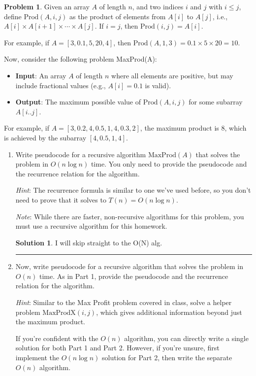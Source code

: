 \documentclass{article}
\theoremstyle{definition}
\newtheorem{problem}{Problem}
\def\fline{\rule{0.75\linewidth}{0.5pt}}
\newcommand{\finishline}{
  \begin{center}\fline
\end{center}}
\newtheorem*{solution*}{Solution}
\newenvironment{solution}{
\begin{solution*}}{{\finishline}
\end{solution*}}
\begin{document}
\newpage

\begin{problem}
  Given an array \( A \) of length \( n \), and two indices \( i \) and \( j \) with \( i \leq j \), define \( \text{Prod}(A,i,j) \) as the product of elements from \( A[i] \) to \( A[j] \), i.e., \( A[i] \times A[i+1] \times \cdots \times A[j] \). If \( i = j \), then \( \text{Prod}(i,j) = A[i] \).

  For example, if \( A = [3, 0.1, 5, 20, 4] \), then \( \text{Prod}(A,1,3) = 0.1 \times 5 \times 20 = 10 \).

  Now, consider the following problem MaxProd(A):

  \begin{itemize}
    \item \textbf{Input}: An array \( A \) of length \( n \) where all elements are positive, but may include fractional values (e.g., \( A[i] = 0.1 \) is valid).
    \item \textbf{Output}: The maximum possible value of \( \text{Prod}(A, i, j) \) for some subarray \( A[i..j] \).
  \end{itemize}

  For example, if \( A = [3, 0.2, 4, 0.5, 1, 4, 0.3, 2] \), the maximum product is \( 8 \), which is achieved by the subarray \( [4, 0.5, 1, 4] \).

\begin{enumerate}[label=\alph*)]
  \item

    Write pseudocode for a recursive algorithm \( \text{MaxProd}(A) \) that solves the problem in \( O(n\log n) \) time. You only need to provide the pseudocode and the recurrence relation for the algorithm.

    \textit{Hint}: The recurrence formula is similar to one we've used before, so you don't need to prove that it solves to \( T(n) = O(n \log n) \).

    \textit{Note}: While there are faster, non-recursive algorithms for this problem, you must use a recursive algorithm for this homework.

    \begin{solution}

      I will skip straight to the O(N) alg.

    \end{solution}

  \item Now, write pseudocode for a recursive algorithm that solves the problem in \( O(n) \) time. As in Part 1, provide the pseudocode and the recurrence relation for the algorithm.

    \textit{Hint}: Similar to the Max Profit problem covered in class, solve a helper problem \( \text{MaxProdX}(i, j) \), which gives additional information beyond just the maximum product.

    If you're confident with the \( O(n) \) algorithm, you can directly write a single solution for both Part 1 and Part 2. However, if you're unsure, first implement the \( O(n \log n) \) solution for Part 2, then write the separate \( O(n) \) algorithm.
\end{enumerate}
\end{problem}
\end{document}
